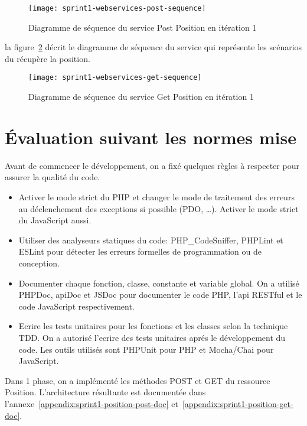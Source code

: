 \begin{figure}[htbp]
    \centering
    \texttt{[image: sprint1-webservices-post-sequence]}
    \caption{Diagramme de séquence du service Post Position en itération 1}
    \label{fig:sprint1-webservices-post-sequence}
\end{figure}

la figure~\ref{fig:sprint1-webservices-get-sequence} décrit le diagramme de
séquence du service  qui représente les scénarios du
récupère la position.

\begin{figure}[htbp]
    \centering
    \texttt{[image: sprint1-webservices-get-sequence]}
    \caption{Diagramme de séquence du service Get Position en itération 1}
    \label{fig:sprint1-webservices-get-sequence}
\end{figure}

\section{Évaluation suivant les normes mise}

Avant de commencer le développement, on a fixé quelques règles à respecter pour
assurer la qualité du code.

\begin{itemize}
    \item Activer le mode strict du PHP et changer le mode de traitement des
        erreurs au déclenchement des exceptions si possible (PDO, \ldots).
        Activer le mode strict du JavaScript aussi.
    \item Utiliser des analyseurs statiques du code: PHP\_CodeSniffer, PHPLint
        et ESLint pour détecter les erreurs formelles de programmation ou de
        conception.
    \item Documenter chaque fonction, classe, constante et variable global. On
        a utilisé PHPDoc, apiDoc et JSDoc pour documenter le code PHP, l'api
        RESTful et le code JavaScript respectivement.
    \item Ecrire les tests unitaires pour les fonctions et les classes selon la
        technique \acrshort{TDD}. On a autorisé l'ecrire des tests unitaires
        aprés le développement du code. Les outils utilisés sont PHPUnit pour
        PHP et Mocha/Chai pour JavaScript. 
\end{itemize}

Dans 1\ier{} phase, on a implémenté les méthodes POST et GET du ressource
Position. L'architecture résultante est documentée dans
l'annexe~\ref{appendix:sprint1-position-post-doc}
et~\ref{appendix:sprint1-position-get-doc}.


